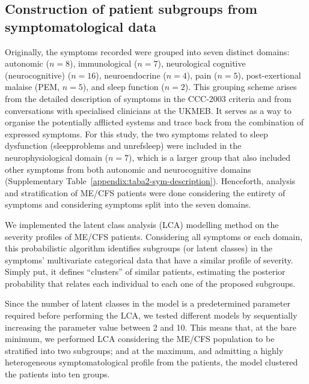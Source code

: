 \subsection{Construction of patient subgroups from symptomatological data}

Originally, the symptoms recorded were grouped into seven distinct domains: autonomic ($n = 8$), immunological ($n = 7$), neurological cognitive (neurocognitive) ($n = 16$), neuroendocrine ($n = 4$), pain ($n = 5$), post-exertional malaise (PEM, $n = 5$), and sleep function ($n = 2$).
This grouping scheme arises from the detailed description of symptoms in the CCC-2003 criteria and from conversations with specialised clinicians at the UKMEB.
It serves as a way to organise the potentially afflicted systems and trace back from the combination of expressed symptoms.
For this study, the two symptoms related to sleep dysfunction (sleepproblems and unrefsleep) were included in the neurophysiological domain ($n = 7$), which is a larger group that also included other symptoms from both autonomic and neurocognitive domains (Supplementary Table~\ref{appendix:taba2-sym-description}).
Henceforth, analysis and stratification of ME/CFS patients were done considering the entirety of symptoms and considering symptoms split into the seven domains.

We implemented the latent class analysis (LCA) modelling method on the severity profiles of ME/CFS patients.
Considering all symptoms or each domain, this probabilistic algorithm identifies subgroups (or latent classes) in the symptoms' multivariate categorical data that have a similar profile of severity.
Simply put, it defines ``clusters'' of similar patients, estimating the posterior probability that relates each individual to each one of the proposed subgroups.

Since the number of latent classes in the model is a predetermined parameter required before performing the LCA, we tested different models by sequentially increasing the parameter value between 2 and 10.
This means that, at the bare minimum, we performed LCA considering the ME/CFS population to be stratified into two subgroups; and at the maximum, and admitting a highly heterogeneous symptomatological profile from the patients, the model clustered the patients into ten groups.

